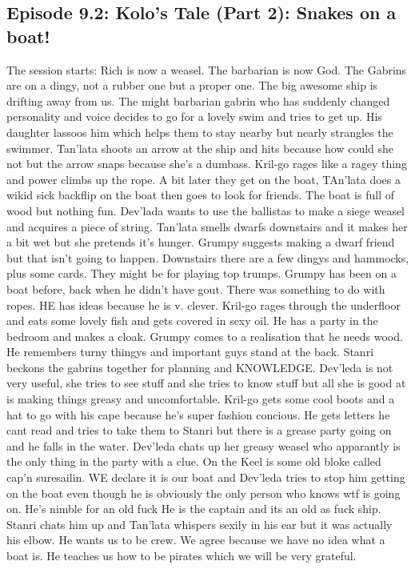 \subsection{Episode 9.2: Kolo's Tale (Part 2): Snakes on a boat!}
The session starts: Rich is now a weasel. The barbarian is now God.\medskip
The Gabrins are on a dingy, not a rubber one but a proper one. The big awesome ship is drifting away from us. The might barbarian gabrin who has suddenly changed personality and voice decides to go for a lovely swim and tries to get up.\medskip
His daughter lassoos him which helps them to stay nearby but nearly strangles the swimmer. Tan’lata shoots an arrow at the ship and hits because how could she not but the arrow snaps because she’s a dumbass.\medskip
Kril-go rages like a ragey thing and power climbs up the rope. A bit later they get on the boat, TAn’lata does a wikid sick backflip on the boat then goes to look for friends.\medskip
The boat is full of wood but nothing fun. Dev’lada wants to use the ballistas to make a siege weasel and acquires a piece of string.\medskip
Tan’lata smells dwarfs downstairs and it makes her a bit wet but she pretends it’s hunger. Grumpy suggests making a dwarf friend but that isn’t going to happen.\medskip
Downstairs there are a few dingys and hammocks, plus some cards. They might be for playing top trumps.\medskip
Grumpy has been on a boat before, back when he didn’t have gout. There was something to do with ropes. HE has ideas because he is v. clever.\medskip
Kril-go rages through the underfloor and eats some lovely fish and gets covered in sexy oil. He has a party in the bedroom and makes a cloak.\medskip
Grumpy comes to a realisation that he needs wood. He remembers turny thingys and important guys stand at the back.\medskip
Stanri beckons the gabrins together for planning and KNOWLEDGE. Dev’leda is not very useful, she tries to see stuff and she tries to know stuff but all she is good at is making things greasy and uncomfortable.\medskip
Kril-go gets some cool boots and a hat to go with his cape because he’s super fashion concious. He gets letters he cant read and tries to take them to Stanri but there is a grease party going on and he falls in the water.\medskip
Dev’leda chats up her greasy weasel who apparantly is the only thing in the party with a clue. On the Keel is some old bloke called cap’n suresailin. WE declare it is our boat and Dev’leda tries to stop him getting on the boat even though he is obviously the only person who knows wtf is going on. He’s nimble for an old fuck\medskip
He is the captain and its an old as fuck ship. Stanri chats him up and Tan’lata whispers sexily in his ear but it was actually his elbow. He wants us to be crew. We agree because we have no idea what a boat is. He teaches us how to be pirates which we will be very grateful.\medskip
